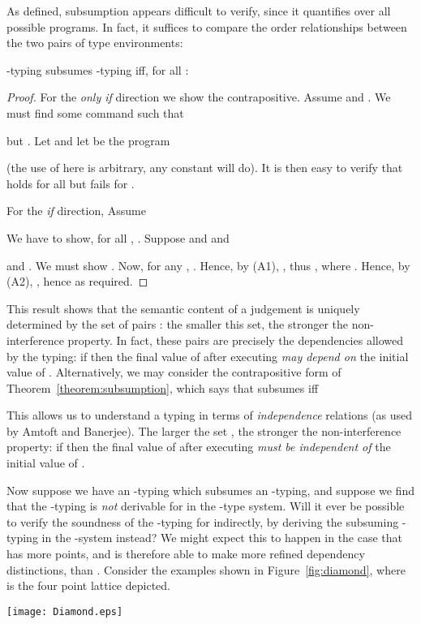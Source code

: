 \documentclass{sigplanconf}
\begin{document}
\begin{table}
As defined, subsumption appears difficult to verify, since it quantifies over all possible programs.
In fact, it suffices to compare the order relationships between the two pairs
of type environments:
\begin{theorem}\label{theorem:subsumption}
    -typing  subsumes
    -typing \; iff, for all :
    
\end{theorem}
\begin{proof}
For the \emph{only if} direction we show the contrapositive.
Assume  and .
We must find some command  such that

but .
Let  and let  be
the program

(the use of  here is arbitrary, any constant will do). It is then easy to verify that
 holds for all  but
 fails for .

For the \emph{if} direction,
Assume

We have to show, for all , .
Suppose  and 
and

and
.
We must show .
Now, for any ,
.
Hence, by (A1),
,
thus , where
.
Hence, by (A2),
,
hence
 as required.
\end{proof}
This result shows that the semantic content of a judgement
 is uniquely determined by the set of pairs
: the smaller this set, the stronger
the non-interference property. In fact, these pairs are precisely the dependencies
allowed by the typing: if  then the final value
of  after executing  \emph{may depend on} the initial value of .
Alternatively, we may consider the contrapositive form of
Theorem~\ref{theorem:subsumption}, which says that
 subsumes
\; iff

This allows us to understand a typing in
terms of \emph{independence} relations (as used by Amtoft and Banerjee).
The larger the set , the stronger
the non-interference property: if  then the final value
of  after executing  \emph{must be independent of} the initial value of .

Now suppose we have an -typing which subsumes an -typing,
and suppose we find that the -typing is \emph{not} derivable for 
in the -type system. Will it ever be possible to verify the soundness
of the -typing for  indirectly, by deriving the subsuming -typing
in the -system instead?
We might expect this to happen
in the case that  has more points, and is therefore able to make more refined
dependency distinctions, than .
Consider the examples shown
in Figure~\ref{fig:diamond}, where
 is the four point lattice depicted.
\begin{figure*}
\begin{center}
\begin{minipage}{20mm}
    \texttt{[image: Diamond.eps]}
\end{minipage}


\end{center}
\end{figure*}
\end{table}
\end{document}
